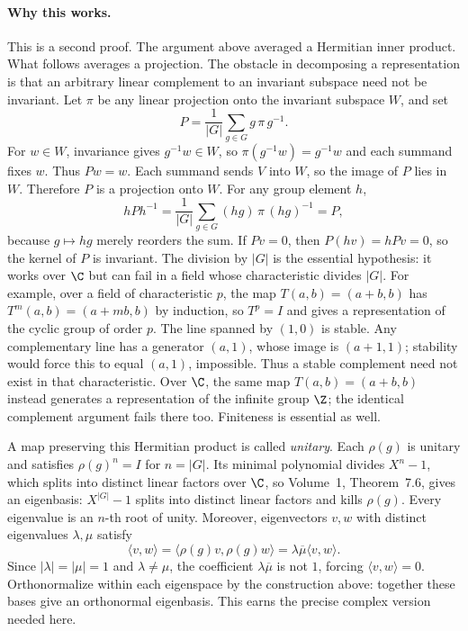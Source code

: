 \paragraph{Why this works.}
This is a second proof. The argument above averaged a Hermitian inner product. What follows averages a projection. The obstacle in decomposing a representation is that an arbitrary linear complement to an invariant subspace need not be invariant. Let $\pi$ be any linear projection onto the invariant subspace $W$, and set
\[
P=\frac1{|G|}\sum_{g\in G}g\,\pi\,g^{-1}.
\]
For $w\in W$, invariance gives $g^{-1}w\in W$, so $\pi(g^{-1}w)=g^{-1}w$ and each summand fixes $w$. Thus $Pw=w$. Each summand sends $V$ into $W$, so the image of $P$ lies in $W$. Therefore $P$ is a projection onto $W$. For any group element $h$,
\[
hPh^{-1}
=\frac1{|G|}\sum_{g\in G}(hg)\,\pi\,(hg)^{-1}=P,
\]
because $g\mapsto hg$ merely reorders the sum. If $Pv=0$, then $P(hv)=hPv=0$, so the kernel of $P$ is invariant. The division by $|G|$ is the essential hypothesis: it works over $\C$ but can fail in a field whose characteristic divides $|G|$.
For example, over a field of characteristic $p$, the map
$T(a,b)=(a+b,b)$ has $T^m(a,b)=(a+mb,b)$ by induction, so $T^p=I$ and gives a representation of the cyclic
group of order $p$. The line spanned by $(1,0)$ is stable. Any complementary
line has a generator $(a,1)$, whose image is $(a+1,1)$; stability would force
this to equal $(a,1)$, impossible. Thus a stable complement need not exist
in that characteristic. Over $\C$, the same map $T(a,b)=(a+b,b)$ instead generates a representation of the infinite group $\Z$; the identical complement argument fails there too. Finiteness is essential as well.

A map preserving this Hermitian product is called \emph{unitary}.
Each $\rho(g)$ is unitary and satisfies $\rho(g)^n=I$ for $n=|G|$.
Its minimal polynomial divides $X^n-1$, which splits into distinct linear
factors over $\C$, so Volume~1, Theorem~7.6, gives an eigenbasis: $X^{|G|}-1$ splits into distinct linear factors and kills $\rho(g)$.
Every eigenvalue is an $n$-th root of unity. Moreover, eigenvectors $v,w$
with distinct eigenvalues $\lambda,\mu$ satisfy
\[
\langle v,w\rangle=\langle\rho(g)v,\rho(g)w\rangle
=\lambda\overline\mu\langle v,w\rangle.
\]
Since $|\lambda|=|\mu|=1$ and $\lambda\ne\mu$, the coefficient
$\lambda\overline\mu$ is not $1$, forcing $\langle v,w\rangle=0$.
Orthonormalize within each eigenspace by the construction above: together
these bases give an orthonormal eigenbasis. This earns the precise complex
version needed here.

